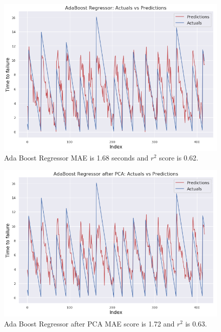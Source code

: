 \documentclass[]{llncs} %
\begin{document}
\begin{figure}[H]
	\centering
	\includegraphics[width=.9\linewidth]{results2}
	\caption{Ada Boost Regressor MAE is 1.68 seconds and $r^2$ score is 0.62.}
	\label{fig:results2}
\end{figure}

\begin{figure}[H]
	\centering
	\includegraphics[width=.9\linewidth]{results2PCA}
	\caption{Ada Boost Regressor after PCA MAE score is 1.72 and $r^2$ is 0.63.}
	\label{fig:results2PCA}
\end{figure}


\clearpage
\newpage
\end{document}
